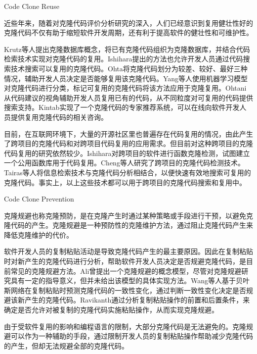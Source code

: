 {Code Clone Reuse}

近些年来，随着对克隆代码评价分析研究的深入，人们已经意识到复用健壮性好的克隆代码不仅有助于缩短软件开发周期，还有利于提高软件的健壮性和可维护性。

Krutz等人提出克隆数据库概念，将已有克隆代码组织为克隆数据库，并结合代码检索技术实现对克隆代码的复用\cite{krutz2014code}。Ishihara提出的方法也允许开发人员通过代码搜索技术搜索可以复用的克隆代码\cite{ishihara2013reusing}。Ohta将克隆代码划分为较差、较好、最好三种情况，辅助开发人员决定是否能够复用该克隆代码\cite{ohta2015source}。Yang等人使用机器学习模型对克隆代码进行分类，标记可复用的克隆代码将该方法应用于克隆复用\cite{yang2015classification}。Ohtani从代码建议的视角辅助开发人员复用已有的代码，从不同粒度对可复用的代码提供搜索支持\cite{ohtani2015level}。Kintab实现了一个克隆代码的专家推荐系统，可以在线向软件开发人员提供复用克隆代码的相关咨询\cite{kintab2014recommending}。

目前，在互联网环境下，大量的开源社区里也普遍存在代码复用的情况，由此产生了跨项目的克隆代码和对跨项目代码复用的应用需求。但目前对这种跨项目的克隆代码复用的研究依然较少。Ishihara对跨项目的软件进行函数克隆检测，试图建立一个公用函数库用于代码复用\cite{ishihara2012inter}。Cheng等人研究了跨项目的克隆代码检测技术\cite{cheng2016feasibility}。Tairas等人将信息检索技术与克隆代码分析相结合，以便快速有效地搜索可复用的克隆代码\cite{tairas2009information}。事实上，以上这些技术都可以用于跨项目的克隆代码搜索和复用中。

{Code Clone Prevention}

克隆规避也称克隆预防，是在克隆产生时通过某种策略或手段进行干预，以避免克隆代码的产生。克隆规避是一种预防性的克隆维护方法，通过阻止克隆代码产生来降低克隆维护的代价。

软件开发人员的复制粘贴活动是导致克隆代码产生的最主要原因。因此在复制粘贴时对新产生的克隆代码进行分析，帮助软件开发人员决定是否规避克隆代码，是目前常见的克隆规避方法。Ali曾提出一个克隆规避的概念模型\cite{ali2013enhancing}，尽管对克隆规避研究具有一定的指导意义，但并未给出该模型的具体实现方法。Wang等人基于贝叶斯网络在复制粘贴时预测克隆代码的一致性变化，通过判断一致性变化决定是否规避该新产生的克隆代码\cite{wang2012can}。Ravikanth通过分析复制粘贴操作的前置和后置条件，来确定是否允许对被复制的克隆代码实施粘贴操作，从而实现克隆规避\cite{venkatasubramanyam2012method}。

由于受软件复用的影响和编程语言的限制，大部分克隆代码是无法避免的。克隆规避可以作为一种辅助的手段，通过限制开发人员的复制粘贴操作帮助减少克隆代码的产生，但却无法规避全部的克隆代码。


